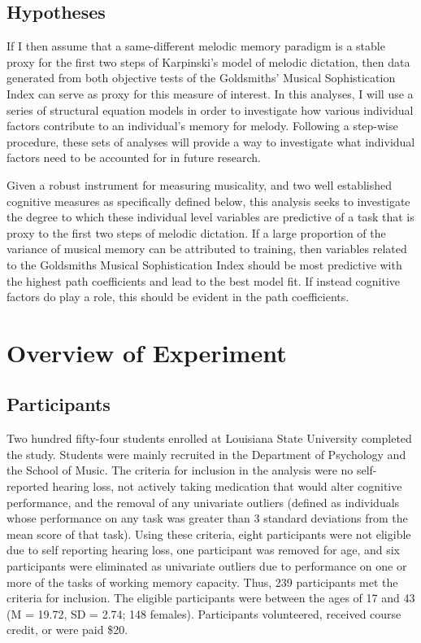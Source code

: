 \documentclass[12pt,]{book}
\begin{document}
\hypertarget{hypotheses}{%
\subsection{Hypotheses}\label{hypotheses}}

If I then assume that a same-different melodic memory paradigm is a stable proxy for the first two steps of Karpinski's model of melodic dictation, then data generated from both objective tests of the Goldsmiths' Musical Sophistication Index can serve as proxy for this measure of interest.
In this analyses, I will use a series of structural equation models in order to investigate how various individual factors contribute to an individual's memory for melody.
Following a step-wise procedure, these sets of analyses will provide a way to investigate what individual factors need to be accounted for in future research.

Given a robust instrument for measuring musicality, and two well established cognitive measures as specifically defined below, this analysis seeks to investigate the degree to which these individual level variables are predictive of a task that is proxy to the first two steps of melodic dictation.
If a large proportion of the variance of musical memory can be attributed to training, then variables related to the Goldsmiths Musical Sophistication Index should be most predictive with the highest path coefficients and lead to the best model fit.
If instead cognitive factors do play a role, this should be evident in the path coefficients.

\hypertarget{overview-of-experiment}{%
\section{Overview of Experiment}\label{overview-of-experiment}}

\hypertarget{participants}{%
\subsection{Participants}\label{participants}}

Two hundred fifty-four students enrolled at Louisiana State University completed the study.
Students were mainly recruited in the Department of Psychology and the School of Music.
The criteria for inclusion in the analysis were no self-reported hearing loss, not actively taking medication that would alter cognitive performance, and the removal of any univariate outliers (defined as individuals whose performance on any task was greater than 3 standard deviations from the mean score of that task).
Using these criteria, eight participants were not eligible due to self reporting hearing loss, one participant was removed for age, and six participants were eliminated as univariate outliers due to performance on one or more of the tasks of working memory capacity.
Thus, 239 participants met the criteria for inclusion.
The eligible participants were between the ages of 17 and 43 (M = 19.72, SD = 2.74; 148 females).
Participants volunteered, received course credit, or were paid \$20.
\end{document}
